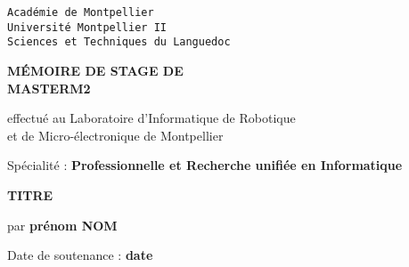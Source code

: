 \pagestyle{fancyplain}
\thispagestyle{empty}
\noindent
\begin{center}
\large{\texttt{Académie de Montpellier}}\\
\Large{\texttt{Université Montpellier II}}\\
\large{\texttt{Sciences et Techniques du Languedoc}}\\
\end{center}

\vspace{1cm}

\begin{center}
\Huge{\textbf{M{\'E}MOIRE DE STAGE DE\\}}
 \vspace{1.0cm}
\Huge{\textbf{MASTERM2}}
\normalsize
\begin{center}
\vspace{1.0cm}

effectué au Laboratoire d'Informatique de Robotique\\
et de Micro-électronique de Montpellier
\end{center}

\vspace{2mm}

\vspace{0.1cm}
\normalsize

\vspace{3mm}

\large{Spécialité} : \textbf{Professionnelle et Recherche unifiée en Informatique}\\
\vspace{1.0cm}

\LARGE{\textbf{TITRE}}
\vspace{2mm}

\begin{center}
  par \textbf{prénom NOM}
\end{center}

\vspace{2mm}



\vspace{4cm}

Date de soutenance : \textbf{date}

\vspace{0.5cm}


\end{center}
